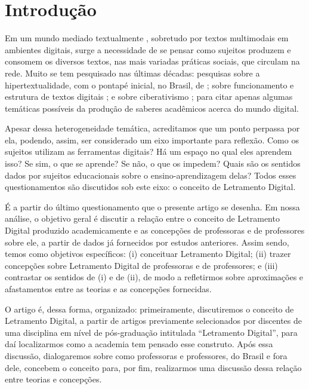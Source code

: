 \documentclass[portuguese]{textolivre}
\begin{document}
\section{Introdução}

Em um mundo mediado textualmente \cite{chouliaraki_discourse_1999}, sobretudo por textos multimodais em ambientes digitais, surge a necessidade de se pensar como sujeitos produzem e consomem os diversos textos, nas mais variadas práticas sociais, que circulam na rede. Muito se tem pesquisado nas últimas décadas: pesquisas sobre a hipertextualidade, com o pontapé inicial, no Brasil, de \textcite{marcuschi_o_2001,marcushi_hipertexto_2005}; sobre funcionamento e estrutura de textos digitais \cite{lima_forma_2017,xavier_reflexoes_2005}; e sobre ciberativismo \cite{alcantara_ciberativismo_2015,araujo_ciberativismo:_2011}; para citar apenas algumas temáticas possíveis da produção de saberes acadêmicos acerca do mundo digital.

Apesar dessa heterogeneidade temática, acreditamos que um ponto perpassa por ela, podendo, assim, ser considerado um eixo importante para reflexão. Como os sujeitos utilizam as ferramentas digitais? Há um espaço no qual eles aprendem isso? Se sim, o que se aprende? Se não, o que os impedem? Quais são os sentidos dados por sujeitos educacionais sobre o ensino-aprendizagem delas? Todos esses questionamentos são discutidos sob este eixo: o conceito de Letramento Digital.

É a partir do último questionamento que o presente artigo se desenha. Em nossa análise, o objetivo geral é discutir a relação entre o conceito de Letramento Digital produzido academicamente e as concepções de professoras e de professores sobre ele, a partir de dados já fornecidos por estudos anteriores. Assim sendo, temos como objetivos específicos: (i) conceituar Letramento Digital; (ii) trazer concepções sobre Letramento Digital de professoras e de professores; e (iii) contrastar os sentidos de (i) e de (ii), de modo a refletirmos sobre aproximações e afastamentos entre as teorias e as concepções fornecidas.

O artigo é, dessa forma, organizado: primeiramente, discutiremos o conceito de Letramento Digital, a partir de artigos previamente selecionados por discentes de uma disciplina em nível de pós-graduação intitulada “Letramento Digital”, para daí localizarmos como a academia tem pensado esse construto. Após essa discussão, dialogaremos sobre como professoras e professores, do Brasil e fora dele, concebem o conceito para, por fim, realizarmos uma discussão dessa relação entre teorias e concepções.
\end{document}
